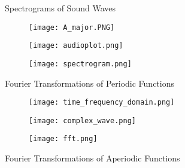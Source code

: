 \documentclass[leqno,presentation]{beamer}
\theoremstyle{definition}
\begin{document}
\begin{frame}
\begin{columns}[t]
\begin{column}{.45\linewidth}
\begin{block}{Spectrograms of Sound Waves}
\begin{figure}[p]
    \centering
	\begin{minipage}{.25 \textwidth}
    \centering
    \texttt{[image: A\_major.PNG]}
    \label{tf1}
	\end{minipage}%
    \begin{minipage}{.4 \textwidth}
    \centering
    \texttt{[image: audioplot.png]}
    \label{tf2}
	\end{minipage}%
	\begin{minipage}{.3 \textwidth}
    \centering
    \texttt{[image: spectrogram.png]}
    \label{tf3}
	\end{minipage}
\end{figure}

\end{block}

\begin{block}{Fourier Transformations of Periodic Functions}

\begin{figure}[p]
    \centering
	\begin{minipage}{.28 \textwidth}
    \centering
    \texttt{[image: time\_frequency\_domain.png]}
    \label{tf1}
	\end{minipage}%
    \begin{minipage}{.38 \textwidth}
    \centering
    \texttt{[image: complex\_wave.png]}
    \label{tf2}
	\end{minipage}%
	\begin{minipage}{.35 \textwidth}
    \centering
    \texttt{[image: fft.png]}
    \label{tf3}
	\end{minipage}
\end{figure}

\end{block}
\begin{block}{Fourier Transformations of Aperiodic Functions}


\end{block}
\end{column}
\end{columns}
\end{frame}
\end{document}
